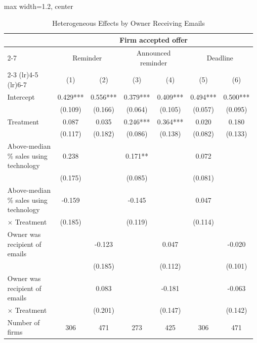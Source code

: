 \begin{table}[H] \centering
\caption{Heterogeneous Effects by Owner Receiving Emails}
\label{tab:het_pct_sales_owner_takeup_ontime}
\begin{adjustbox}{max width=1.2\textwidth, center}
\begin{tabular}{lcccccc}
\toprule
 & \multicolumn{6}{c}{Firm accepted offer} \\
\cmidrule(lr){2-7}
\multicolumn{1}{r}{Treatment:} & \multicolumn{2}{c}{Reminder} & \multicolumn{2}{c}{Announced reminder} & \multicolumn{2}{c}{Deadline} \\
\cmidrule(lr){2-3} \cmidrule(lr){4-5} \cmidrule(lr){6-7}
 & (1) & (2) & (3) & (4) & (5) & (6) \\
\midrule
Intercept & 0.429*** & 0.556*** & 0.379*** & 0.409*** & 0.494*** & 0.500*** \\ & (0.109) & (0.166) & (0.064) & (0.105) & (0.057) & (0.095) \\
Treatment & 0.087 & 0.035 & 0.246*** & 0.364*** & 0.020 & 0.180 \\ & (0.117) & (0.182) & (0.086) & (0.138) & (0.082) & (0.133) \\
Above-median \% sales using technology & 0.238 &  & 0.171** &  & 0.072 &  \\ & (0.175) &  & (0.085) &  & (0.081) \\
Above-median \% sales using technology & -0.159 &  & -0.145 &  & 0.047 &   \\
\hspace{1em} $\times$ Treatment & (0.185) &  & (0.119) &  & (0.114)  \\
Owner was recipient of emails &  & -0.123 &  & 0.047 &  & -0.020 \\ &  & (0.185) &  & (0.112) &  & (0.101) \\
Owner was recipient of emails &  & 0.083 &  & -0.181 &  & -0.063  \\
\hspace{1em} $\times$ Treatment &  & (0.201) &  & (0.147) &  & (0.142)  \\
\midrule
Number of firms & 306 & 471 & 273 & 425 & 306 & 471 \\
\bottomrule
\end{tabular}
\end{adjustbox}
\end{table}
